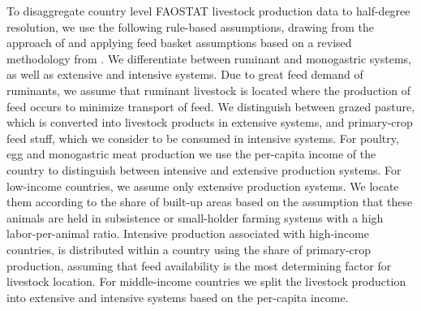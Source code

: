 \documentclass[gc, manuscript]{copernicus}
\begin{document}
To disaggregate country level FAOSTAT livestock production data to half-degree resolution, we use the following rule-based assumptions, drawing from the approach of \citep{robinson_mapping_2014} and applying feed basket assumptions based on a revised methodology from \citep{weindl_livestock_2017}. We differentiate between ruminant and monogastric systems, as well as extensive and intensive systems.
Due to great feed demand of ruminants, we assume that ruminant livestock is located where the production of feed occurs to minimize transport of feed. We distinguish between grazed pasture, which is converted into livestock products in extensive systems, and primary-crop feed stuff, which we consider to be consumed in intensive systems.
For poultry, egg and monogastric meat production we use the per-capita income of the country to distinguish between intensive and extensive production systems. For low-income countries, we assume only extensive production systems. We locate them according to the share of built-up areas based on the assumption that these animals are held in subsistence or small-holder farming systems with a high labor-per-animal ratio. Intensive production associated with high-income countries, is distributed within a country using the share of primary-crop production, assuming that feed availability is the most determining factor for livestock location. For middle-income countries we split the livestock production into extensive and intensive systems based on the per-capita income.
\end{document}
